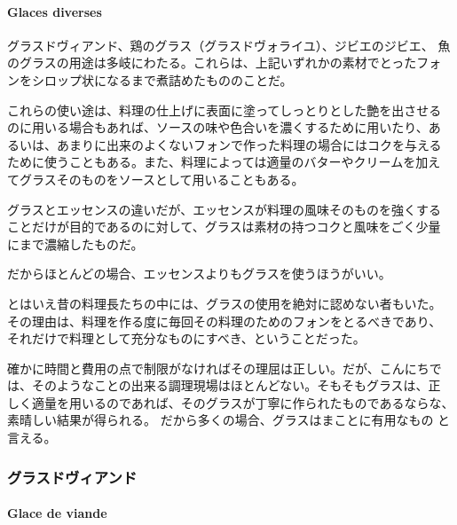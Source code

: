 \begin{recette}
{\paragraph{Glaces diverses}\label{glaces-diverses}}


グラスドヴィアンド、鶏のグラス（グラスドヴォライユ）、ジビエのジビエ、
魚のグラスの用途は多岐にわたる。これらは、上記いずれかの素材でとったフォ
ンをシロップ状になるまで煮詰めたもののことだ。

これらの使い途は、料理の仕上げに表面に塗ってしっとりとした艶を出させる
のに用いる場合もあれば、ソースの味や色合いを濃くするために用いたり、あ
るいは、あまりに出来のよくないフォンで作った料理の場合にはコクを与える
ために使うこともある。また、料理によっては適量のバターやクリームを加え
てグラスそのものをソースとして用いることもある。

グラスとエッセンスの違いだが、エッセンスが料理の風味そのものを強くする
ことだけが目的であるのに対して、グラスは素材の持つコクと風味をごく少量
にまで濃縮したものだ。

だからほとんどの場合、エッセンスよりもグラスを使うほうがいい。

とはいえ昔の料理長たちの中には、グラスの使用を絶対に認めない者もいた。
その理由は、料理を作る度に毎回その料理のためのフォンをとるべきであり、
それだけで料理として充分なものにすべき、ということだった。

確かに時間と費用の点で制限がなければその理屈は正しい。だが、こんにちで
は、そのようなことの出来る調理現場はほとんどない。そもそもグラスは、正
しく適量を用いるのであれば、そのグラスが丁寧に作られたものであるならな、
素晴しい結果が得られる。 だから多くの場合、グラスはまことに有用なもの
と言える。

\maeaki

\hypertarget{glacedeviande}{%
\subsubsection{グラスドヴィアンド}\label{glacedeviande}}

\hypertarget{glace-de-viande}{%
\paragraph{Glace de viande}\label{glace-de-viande}}



\end{recette}
